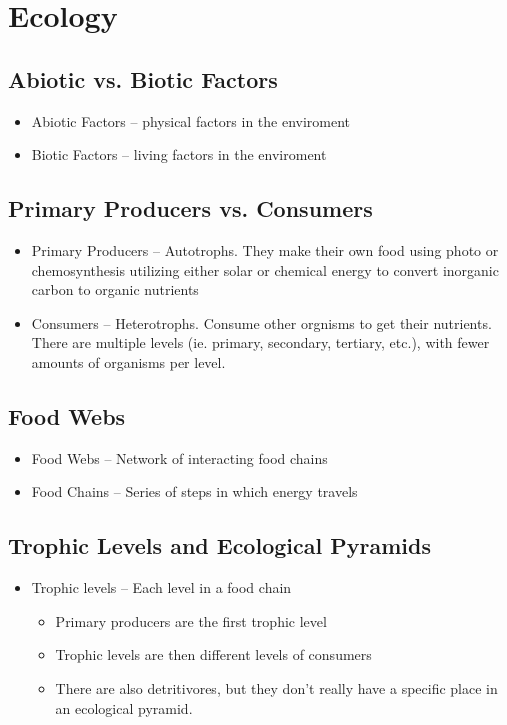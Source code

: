 \documentclass{article}
\begin{document}
\section{Ecology}

\subsection{Abiotic vs. Biotic Factors}
\begin{itemize}
\item Abiotic Factors -- physical factors in the enviroment
\item Biotic  Factors -- living factors in the enviroment
\end{itemize}

\subsection{Primary Producers vs. Consumers}
\begin{itemize}
\item Primary Producers -- Autotrophs. They make their own food using photo or chemosynthesis utilizing either solar or chemical energy to convert inorganic carbon to organic nutrients
\item Consumers -- Heterotrophs. Consume other orgnisms to get their nutrients. There are multiple levels (ie. primary, secondary, tertiary, etc.), with fewer amounts of organisms per level.
\end{itemize}

\subsection{Food Webs}
\begin{itemize}
\item Food Webs -- Network of interacting food chains
\item Food Chains -- Series of steps in which energy travels
\end{itemize}

\subsection{Trophic Levels and Ecological Pyramids}
\begin{itemize}
\item Trophic levels -- Each level in a food chain
\begin{itemize}
\item Primary producers are the first trophic level
\item Trophic levels are then different levels of consumers
\item There are also detritivores, but they don't really have a specific place in an ecological pyramid.
\end{itemize}
\end{itemize}
\end{document}
